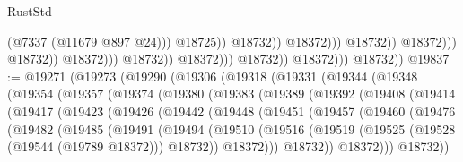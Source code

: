 \begin{lexlean}{RustStd}
\begin{coremodule}
                                                                (@7337 (@11679 @897 @24)))
                                                              @18725))
                                                          @18732))
                                                      @18372)))
                                                @18732))
                                            @18372)))
                                      @18732))
                                  @18372)))
                            @18732))
                        @18372)))
                  @18732))
              @18372)))
        @18732))
@19837 := @19271
    (@19273
      (@19290
        (@19306
          (@19318
            (@19331
              (@19344
                (@19348
                  (@19354
                    (@19357
                      (@19374
                        (@19380
                          (@19383
                            (@19389
                              (@19392
                                (@19408
                                  (@19414
                                    (@19417
                                      (@19423
                                        (@19426
                                          (@19442
                                            (@19448
                                              (@19451
                                                (@19457
                                                  (@19460
                                                    (@19476
                                                      (@19482
                                                        (@19485
                                                          (@19491
                                                            (@19494
                                                              (@19510
                                                                (@19516
                                                                  (@19519
                                                                    (@19525
                                                                      (@19528
                                                                        (@19544 (@19789 @18372)))
                                                                      @18732))
                                                                  @18372)))
                                                            @18732))
                                                        @18372)))
                                                  @18732))

\end{coremodule}
\end{lexlean}
